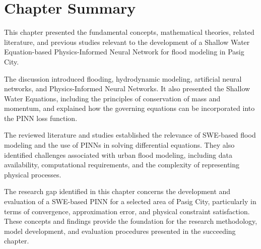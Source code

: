 \section{Chapter Summary}


This chapter presented the fundamental concepts, mathematical theories, related literature, and previous studies relevant to the development of a Shallow Water Equation-based Physics-Informed Neural Network for flood modeling in Pasig City.

The discussion introduced flooding, hydrodynamic modeling, artificial neural networks, and Physics-Informed Neural Networks. It also presented the Shallow Water Equations, including the principles of conservation of mass and momentum, and explained how the governing equations can be incorporated into the PINN loss function.

The reviewed literature and studies established the relevance of SWE-based flood modeling and the use of PINNs in solving differential equations. They also identified challenges associated with urban flood modeling, including data availability, computational requirements, and the complexity of representing physical processes.

The research gap identified in this chapter concerns the development and evaluation of a SWE-based PINN for a selected area of Pasig City, particularly in terms of convergence, approximation error, and physical constraint satisfaction. These concepts and findings provide the foundation for the research methodology, model development, and evaluation procedures presented in the succeeding chapter.
